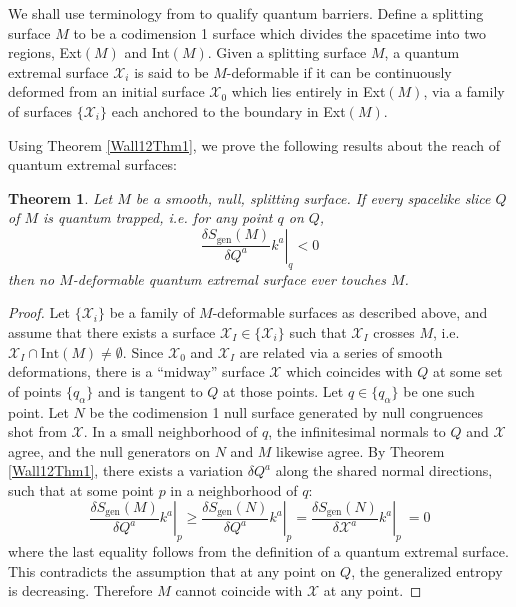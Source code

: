 \documentclass[12pt]{article}
\newtheorem{thm}{Theorem}[section]
\theoremstyle{remark}
\newcommand{\aw}[1]{{\color{blue}#1}}
\numberwithin{equation}{section}
\numberwithin{equation}{section}
\begin{document}
We shall use terminology from \cite{EngelhardtWall} to qualify quantum barriers. Define a splitting surface $M$ to be a codimension 1 surface which divides the spacetime into two regions, Ext$(M)$ and Int$(M)$. Given a splitting surface $M$, a quantum extremal surface $\mathcal{X}_{i}$ is said to be $M$-deformable if it can be continuously deformed from an initial surface $\mathcal{X}_{0}$ which lies entirely in Ext$(M)$, via a family of surfaces $\{\mathcal{X}_{i}\}$ each anchored to the boundary in Ext$(M)$.

Using Theorem \ref{Wall12Thm1}, we  prove the following results about the reach of quantum extremal surfaces:
\begin{thm} \label{NegBarrier}Let $M$ be a smooth, null, splitting surface.  If every spacelike slice $Q$ of $M$ is quantum trapped, i.e. for any point $q$ on $Q$,
\begin{equation}
\left. \frac{\delta S_\mathrm{gen}(M)}{\delta Q^{a}}k^{a}\right|_{q}<0 
\end{equation}
then no $M$-deformable quantum extremal surface ever touches $M$.  
\end{thm}
\begin{proof} Let $\{\mathcal{X}_{i}\}$ be a family of $M$-deformable surfaces as described above, and assume that there exists a surface $\mathcal{X}_{I}\in\{\mathcal{X}_{i}\}$ such that $\mathcal{X}_{I}$ crosses $M$, i.e. $\mathcal{X}_{I} \cap \text{Int}\left ( M\right)\neq \emptyset$. Since $\mathcal{X}_{0}$ and $\mathcal{X}_{I}$ are related via a series of smooth deformations, there is a ``midway'' surface $\mathcal{X}$ which coincides with $Q$ at some set of points $\{q_{\alpha}\}$ and is tangent to $Q$ at those points. Let $q\in \{q_{\alpha}\}$ be one such point.  Let $N$ be the codimension 1 null surface generated by null congruences shot from $\mathcal{X}$. In a small neighborhood of $q$, the infinitesimal normals to $Q$ and $\mathcal{X}$ agree, and the null generators on $N$ and $M$ likewise agree. By Theorem \ref{Wall12Thm1}, there exists a variation $\delta Q^{a}$ along the shared normal directions, such that at some point $p$ in a neighborhood of $q$:
\begin{equation}\left .\frac{\delta S_\mathrm{gen}\left(M\right)}{\delta Q^{a}}k^{a} \right | _{p}\geq \left . \frac{\delta  S_\mathrm{gen}\left(N\right)}{\delta Q^{a}}k^{a}\right | _{p} =\left . \frac{\delta S_\mathrm{gen}\left(N\right)}{\delta \mathcal{X}^{a}}k^{a} \right | _{p}\ =0  \end{equation}
where the last equality follows from the definition of a quantum extremal surface. This contradicts the assumption that at any point on $Q$, the generalized entropy is decreasing. Therefore $M$ cannot coincide with $\mathcal{X}$ at any point. 
%
\end{proof}
%
\end{document}
